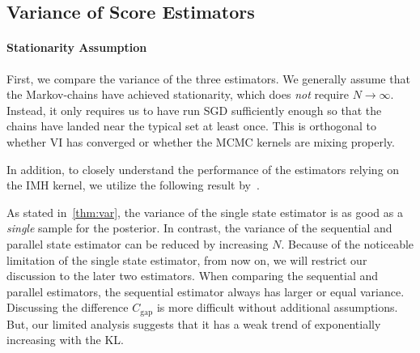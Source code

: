 \vspace{-0.05in}
\subsection{Variance of Score Estimators}\label{section:var}
\paragraph{Stationarity Assumption}
First, we compare the variance of the three estimators.
We generally assume that the Markov-chains have achieved stationarity, which does \textit{not} require \(N \rightarrow \infty\).
Instead, it only requires us to have run SGD sufficiently enough so that the chains have landed near the typical set at least once.
This is orthogonal to whether VI has converged or whether the MCMC kernels are mixing properly.

In addition, to closely understand the performance of the estimators relying on the IMH kernel, we utilize the following result by~\citet{Smith96exacttransition}.


%
%


As stated in~\cref{thm:var}, the variance of the single state estimator is as good as a \textit{single} sample for the posterior.
In contrast, the variance of the sequential and parallel state estimator can be reduced by increasing \(N\).
Because of the noticeable limitation of the single state estimator, from now on, we will restrict our discussion to the later two estimators.
When comparing the sequential and parallel estimators, the sequential estimator always has larger or equal variance.
Discussing the difference \(C_{\text{gap}}\) is more difficult without additional assumptions.
But, our limited analysis suggests that it has a weak trend of exponentially increasing with the KL.


